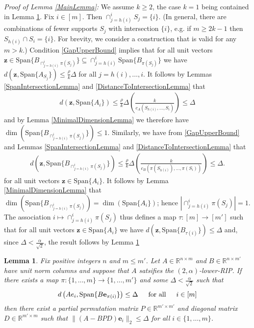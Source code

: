 \documentclass[journal,onecolumn]{IEEEtran}
\newtheorem{lemma}{Lemma}
\begin{document}
\emph{Proof of Lemma \ref{MainLemma}:} 
We assume $k \geq 2$, the case $k = 1$ being contained in Lemma \ref{VectorUniquenessLemma}. Fix $i \in [m]$. Then $\cap_{j=h(i)}^{i} S_j = \{i\}$. (In general, there are combinations of fewer supports $S_j$ with intersection $\{i\}$, e.g. if $m \geq 2k-1$ then $S_{h(i)} \cap S_i = \{i\}$. For brevity, we consider a construction that is valid for any $m > k$.) Condition \eqref{GapUpperBound} implies that for all unit vectors $\mathbf{z} \in  \text{Span}\{B_{\cap_{j = h(i)}^i\pi(S_j)}\} \subseteq \cap_{j = h(i)}^i \text{Span}\{B_{\pi(S_j)}\}$ we have $d(\mathbf{z}, \text{Span}\{A_{S_j}\}) \leq \frac{\rho}{k} \Delta$ for all $j = h(i), \ldots, i$. It follows by Lemmas \ref{SpanIntersectionLemma} and \ref{DistanceToIntersectionLemma} that
\begin{align}
d\left( \mathbf{z}, \text{Span}\{A_{i}\} \right) 
\leq \frac{\rho}{k}\Delta \left( \frac{k}{c_A(S_{h(i)}, \ldots, S_i)} \right)
\leq \Delta
\end{align}
%
and by Lemma \ref{MinimalDimensionLemma} we therefore have $\dim(\text{Span}\{B_{\cap_{j = h(i)}^i\pi(S_j)}\}) \leq 1$. Similarly, we have from \eqref{GapUpperBound} and Lemmas \ref{SpanIntersectionLemma} and \ref{DistanceToIntersectionLemma} that 
\begin{align}
d\left( \mathbf{z}, \text{Span}\{B_{\cap_{j=h(i)}^i\pi(S_j)}\} \right) 
\leq \frac{\rho}{k}\Delta \left( \frac{k}{c_B(\pi(S_{h(i)}), \ldots, \pi(S_i))} \right)
\leq \Delta.
\end{align}
%
for all unit vectors $\mathbf{z} \in \text{Span}\{A_{i}\}$. It follows by Lemma \ref{MinimalDimensionLemma} that $\dim(\text{Span}\{B_{\cap_{j = h(i)}^i\pi(S_j)}) = \dim(\text{Span}\{A_i\})$; hence $|\cap_{j = h(i)}^i\pi(S_j)| = 1$. The association $i \mapsto \cap_{j = h(i)}^i\pi(S_j)$ thus defines a map $\tau: [m] \to [m']$ such that for all unit vectors $\mathbf{z} \in \text{Span}\{A_{i}\}$ we have $d\left( \mathbf{z}, \text{Span}\{B_{\tau(i)}\} \right) \leq \Delta$ and, since $\Delta < \frac{\alpha}{\sqrt{2}}$, the result follows by Lemma \ref{VectorUniquenessLemma}


\begin{lemma}\label{VectorUniquenessLemma}
Fix positive integers $n$ and $m \leq m'$. Let $A\in \mathbb{R}^{n \times m}$ and $B \in \mathbb{R}^{n \times m'}$ have unit norm columns and suppose that $A$ satsifies the $(2,\alpha)$-lower-RIP. If there exists a map $\pi: \{1, \ldots, m\} \to \{1, \ldots, m'\}$ and some $\Delta < \frac{\alpha}{\sqrt{2}}$ such that 
\begin{align}\label{VULcondition}
d\left( Ae_i, \text{Span}\{B\mathbf{e}_{\pi(i)}\} \right) \leq \Delta \indent \text{for all} \indent i \in [m]
\end{align}
%
then there exist a partial permutation matrix $P \in \mathbb{R}^{m' \times m'}$ and diagonal matrix $D \in \mathbb{R}^{m' \times m}$ such that $\|(A - BPD)\mathbf{e}_i\|_2 \leq \Delta$ for all $i \in \{1, \ldots, m\}$.
\end{lemma}
\end{document}
